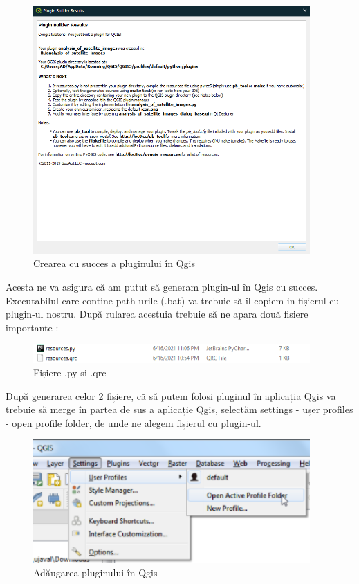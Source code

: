 \documentclass[12pt,a4paper]{article}
\theoremstyle{definition}
\theoremstyle{remark}
\begin{document}
\begin{figure}[H]
  \centering
  \includegraphics[width=300pt]{saveplugin.PNG}
  \caption{Crearea cu succes a pluginului în Qgis }   
\end{figure}

Acesta ne va asigura că am putut să generam plugin-ul în Qgis cu succes. Executabilul care contine path-urile (.bat) va trebuie să îl copiem in fișierul cu plugin-ul nostru. După rularea acestuia trebuie să ne apara două fisiere importante :


\begin{figure}[H]
  \centering
  \includegraphics[width=300pt]{fisierePNG.PNG}
  \caption{Fișiere .py si .qrc}   
\end{figure}

După generarea celor 2 fișiere, că să putem folosi pluginul în aplicația Qgis va trebuie să merge în partea de sus a aplicație Qgis, selectăm settings - ușer profiles - open profile folder, de unde ne alegem fișierul cu plugin-ul. 


\begin{figure}[H]
  \centering
  \includegraphics[width=300pt]{addplugin.PNG}
  \caption{Adăugarea pluginului în Qgis \cite{script}}   
\end{figure}
\end{document}

